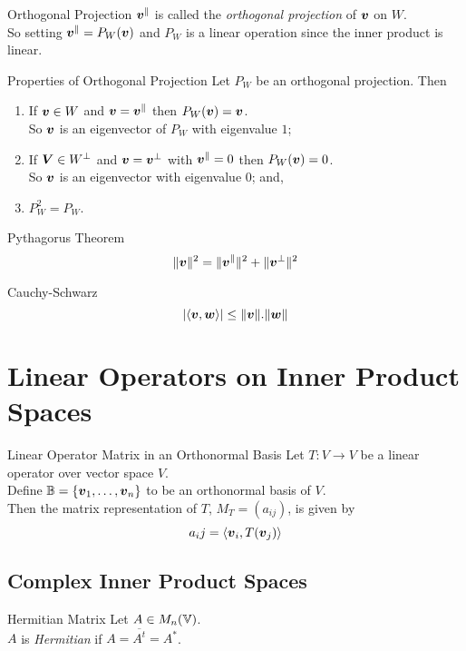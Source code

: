 \documentclass[11pt,a4paper]{article}
\begin{document}
\subtitle{Remark 9.18 - }{Orthogonal Projection}
$\boldsymbol{v}^{\|}$ is called the \textit{orthogonal projection} of $\boldsymbol{v}$ on $W$.\\
So setting $\boldsymbol{v}^{\|} = P_W(\boldsymbol{v})$ and $P_W$ is a linear operation since the inner product is linear.\\

\subtitle{Theorem 9.19 - }{Properties of Orthogonal Projection}
Let $P_W$ be an orthogonal projection. Then
\begin{enumerate}[label=\roman*)]
  \item If $\boldsymbol{v} \in W$ and $\boldsymbol{v} = \boldsymbol{v}^{\|}$ then $P_W(\boldsymbol{v}) = \boldsymbol{v}$.\\
  So $\boldsymbol{v}$ is an eigenvector of $P_W$ with eigenvalue $1$;
  \item If $\boldsymbol{V} \in W^{\bot}$ and $\boldsymbol{v} = \boldsymbol{v}^{\bot}$ with $\boldsymbol{v}^{\|} = 0$ then $P_W(\boldsymbol{v}) = 0$.\\
  So $\boldsymbol{v}$ is an eigenvector with eigenvalue 0; and,
  \item $P_W^2 = P_W$.
\end{enumerate}

\subtitle{Theorem 9.20 - }{Pythagorus Theorem}
$$\|\boldsymbol{v}\|^2 = \|\boldsymbol{v}^{\|}\|^2 + \|\boldsymbol{v}^{\bot}\|^2$$

\subtitle{Theorem 9.21 - }{Cauchy-Schwarz}
$$|\langle \boldsymbol{v}, \boldsymbol{w} \rangle | \leq \|\boldsymbol{v}\|.\|\boldsymbol{w}\|$$

\section{Linear Operators on Inner Product Spaces}

\subtitle{Theorem 10.01 - }{Linear Operator Matrix in an Orthonormal Basis}
Let $T : V \to V$ be a linear operator over vector space $V$.\\
Define $\mathbb{B} = \{\boldsymbol{v}_1 , \dots , \boldsymbol{v}_n\}$ to be an orthonormal basis of $V$.\\
Then the matrix representation of $T$, $M_T = (a_{ij})$, is given by
$$a_ij = \langle \boldsymbol{v}_i, T(\boldsymbol{v}_j) \rangle$$

\subsection{Complex Inner Product Spaces}

\subtitle{Definition 10.02 - }{Hermitian Matrix}
Let $A \in M_n(\mathbb{V})$.\\
$A$ is \textit{Hermitian} if $A = \overline{A^t} = A^*$.\\
\end{document}
